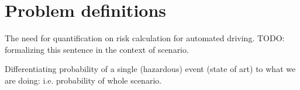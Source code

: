 \section{Problem definitions}
\label{sec:problem} %

The need for quantification on risk calculation for automated driving. 
TODO: formalizing this sentence in the context of scenario. 

Differentiating probability of a single (hazardous) event (state of art) to what we are doing: i.e. probability of whole scenario. 
